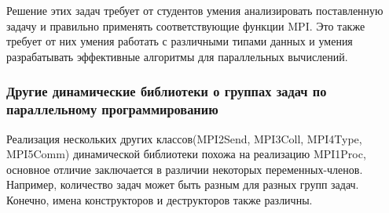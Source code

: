 Решение этих задач требует от студентов умения анализировать поставленную задачу и правильно применять соответствующие функции MPI. Это также требует от них умения работать с различными типами данных и умения разрабатывать эффективные алгоритмы для параллельных вычислений.

\subsubsection{Другие динамические библиотеки о группах задач по параллельному программированию}

Реализация нескольких других классов(MPI2Send, MPI3Coll, MPI4Type, MPI5Comm) динамической библиотеки похожа на реализацию MPI1Proc, 
основное отличие заключается в различии некоторых переменных-членов. Например, количество задач может быть разным для разных групп задач. 
Конечно, имена конструкторов и деструкторов также различны.












